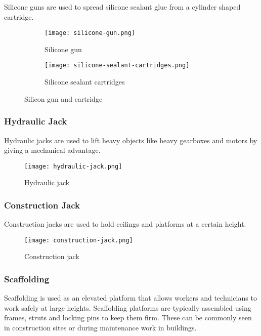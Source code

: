 \documentclass[a4paper,12pt]{article}
\begin{document}
					Silicone guns are used to spread silicone sealant glue from a cylinder shaped cartridge.							
						\begin{figure}[H]
							\begin{subfigure}{0.5\textwidth}
								\centering				
								\texttt{[image: silicone-gun.png]}
								\caption{Silicone gun}
								\label{subfig:silicone-gun}
							\end{subfigure}
							\hfill
							\begin{subfigure}{0.5\textwidth}
								\centering
								\texttt{[image: silicone-sealant-cartridges.png]}
								\label{subfig:silicone-cartridge}
								\caption{Silicone sealant cartridges}
							\end{subfigure}
							\label{fig:silicon-gun-and-sealant}
							\caption{Silicon gun and cartridge}
						\end{figure}
						
						
				\subsubsection*{Hydraulic Jack}
					Hydraulic jacks are used to lift heavy objects like heavy gearboxes and motors by giving a mechanical advantage.
									
						\begin{figure}[H]
							\centering				
							\texttt{[image: hydraulic-jack.png]}
							\caption{Hydraulic jack}
							\label{fig:hydraulic-jack}
						\end{figure}
						
				\subsubsection*{Construction Jack}
					Construction jacks are used to hold ceilings and platforms at a certain height. 						
						\begin{figure}[H]
							\centering				
							\texttt{[image: construction-jack.png]}
							\caption{Construction jack}
							\label{fig:construction-jack}
						\end{figure}						
						
				\subsubsection*{Scaffolding}
					Scaffolding is used as an elevated platform that allows workers and technicians	to work safely at large heights.
					Scaffolding platforms are typically assembled using frames, struts and locking pins to keep them firm.
					These can be commonly seen in construction sites or during maintenance work in buildings. 
					
\end{document}
